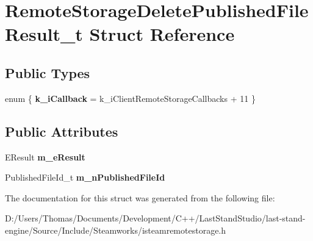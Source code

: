 \hypertarget{structRemoteStorageDeletePublishedFileResult__t}{}\section{Remote\+Storage\+Delete\+Published\+File\+Result\+\_\+t Struct Reference}
\label{structRemoteStorageDeletePublishedFileResult__t}
\subsection*{Public Types}
\begin{DoxyCompactItemize}
\item 
\hypertarget{structRemoteStorageDeletePublishedFileResult__t_ac8a0a0c48a1c02ce7e0212b3c7b051e7}{}enum \{ {\bfseries k\+\_\+i\+Callback} = k\+\_\+i\+Client\+Remote\+Storage\+Callbacks + 11
 \}\label{structRemoteStorageDeletePublishedFileResult__t_ac8a0a0c48a1c02ce7e0212b3c7b051e7}

\end{DoxyCompactItemize}
\subsection*{Public Attributes}
\begin{DoxyCompactItemize}
\item 
\hypertarget{structRemoteStorageDeletePublishedFileResult__t_a035613bf612b162280e1fdcadfe89100}{}E\+Result {\bfseries m\+\_\+e\+Result}\label{structRemoteStorageDeletePublishedFileResult__t_a035613bf612b162280e1fdcadfe89100}

\item 
\hypertarget{structRemoteStorageDeletePublishedFileResult__t_ad1b447d9d061d851358a0eb14bed2752}{}Published\+File\+Id\+\_\+t {\bfseries m\+\_\+n\+Published\+File\+Id}\label{structRemoteStorageDeletePublishedFileResult__t_ad1b447d9d061d851358a0eb14bed2752}

\end{DoxyCompactItemize}


The documentation for this struct was generated from the following file\+:\begin{DoxyCompactItemize}
\item 
D\+:/\+Users/\+Thomas/\+Documents/\+Development/\+C++/\+Last\+Stand\+Studio/last-\/stand-\/engine/\+Source/\+Include/\+Steamworks/isteamremotestorage.\+h\end{DoxyCompactItemize}
